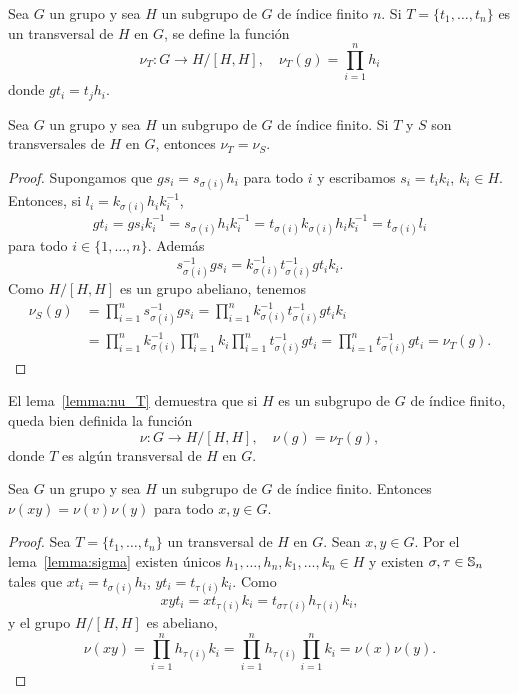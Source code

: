 \begin{definition}
	\label{definition:nu_T}
	Sea $G$ un grupo y sea $H$ un subgrupo de $G$ de índice finito $n$. Si
	$T=\{t_1,\dots,t_n\}$ es un transversal de $H$ en $G$, se define la función 
	\[
		\nu_T\colon G\to H/[H,H],\quad
		\nu_T(g)=\prod_{i=1}^n h_i
	\]
	donde $gt_i=t_jh_i$.
\end{definition}

\begin{lemma}
	\label{lemma:nu_T}
	Sea $G$ un grupo y sea $H$ un subgrupo de $G$ de índice finito. Si $T$ y
	$S$ son transversales de $H$ en $G$, entonces $\nu_T=\nu_S$.
\end{lemma}

\begin{proof}
	Supongamos que $gs_i=s_{\sigma(i)}h_i$ para todo $i$ y escribamos
	$s_i=t_ik_i$, $k_i\in H$. Entonces, si $l_i=k_{\sigma(i)}h_ik_i^{-1}$, 
	\[
	gt_i=gs_ik_i^{-1}=s_{\sigma(i)}h_ik_i^{-1}=t_{\sigma(i)}k_{\sigma(i)}h_ik_i^{-1}=t_{\sigma(i)}l_i
	\]
	para todo $i\in\{1,\dots,n\}$. Además 
	\[
			s_{\sigma(i)}^{-1}gs_i=k_{\sigma(i)}^{-1}t_{\sigma(i)}^{-1}gt_ik_i.
	\]
	Como $H/[H,H]$ es un grupo abeliano, tenemos 
	\begin{align*}
		\nu_S(g)
		&=\prod_{i=1}^n s_{\sigma(i)}^{-1}gs_i
		=\prod_{i=1}^n k_{\sigma(i)}^{-1}t_{\sigma(i)}^{-1}gt_ik_i\\
		&=\prod_{i=1}^n k_{\sigma(i)}^{-1}\prod_{i=1}^n k_i\prod_{i=1}^n t_{\sigma(i)}^{-1}gt_i
		=\prod_{i=1}^n t_{\sigma(i)}^{-1}gt_i
		=\nu_T(g).
	\end{align*}
\end{proof}

El lema~\ref{lemma:nu_T} demuestra que si $H$ es un subgrupo de $G$ de índice
finito, queda bien definida la función
\[
\nu\colon G\to H/[H,H],
\quad
\nu(g)=\nu_T(g),
\]
donde $T$ es algún transversal de $H$ en $G$. 

\begin{theorem}
	\label{theorem:transfer}
	Sea $G$ un grupo y sea $H$ un subgrupo de $G$ de índice finito. Entonces
	$\nu(xy)=\nu(v)\nu(y)$ para todo $x,y\in G$.
\end{theorem}

\begin{proof}
	Sea $T=\{t_1,\dots,t_n\}$ un transversal de $H$ en $G$. Sean $x,y\in G$. Por el
	lema~\ref{lemma:sigma} existen únicos $h_1,\dots,h_n,k_1,\dots,k_n\in H$ y
	existen $\sigma,\tau\in\mathbb{S}_n$ tales que $xt_i=t_{\sigma(i)}h_i$,
	$yt_i=t_{\tau(i)}k_i$. Como
	\[
	xyt_i=xt_{\tau(i)}k_i=t_{\sigma\tau(i)}h_{\tau(i)}k_i,
	\]
	y el grupo $H/[H,H]$ es abeliano, 
	\[
		\nu(xy)=\prod_{i=1}^n h_{\tau(i)}k_i=\prod_{i=1}^n h_{\tau(i)}\prod_{i=1}^n k_i=\nu(x)\nu(y).
	\]
\end{proof}

